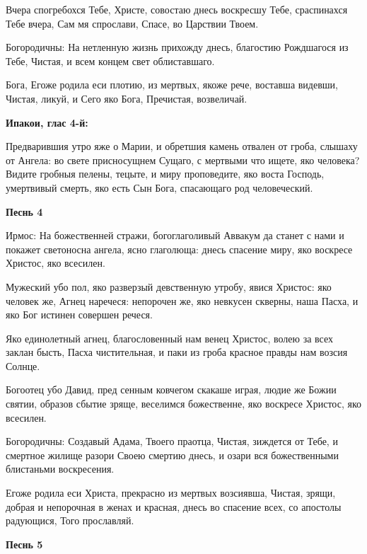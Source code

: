 Вчера спогребохся Тебе, Христе, совостаю днесь воскресшу Тебе, сраспинахся Тебе вчера, Сам мя спрослави, Спасе, во Царствии Твоем. \itshape 

Богородичны\normalfont{}: На нетленную жизнь прихожду днесь, благостию Рождшагося из Тебе, Чистая, и всем концем свет облиставшаго. 



Бога, Егоже родила еси плотию, из мертвых, якоже рече, воставша видевши, Чистая, ликуй, и Сего яко Бога, Пречистая, возвеличай. 


\medskip
\bfseries Ипакои, глас 4-й:

\normalfont{}Предварившия утро яже о Марии, и обретшия камень отвален от гроба, слышаху от Ангела: во свете присносущнем Сущаго, с мертвыми что ищете, яко человека? Видите гробныя пелены, тецыте, и миру проповедите, яко воста Господь, умертвивый смерть, яко есть Сын Бога, спасающаго род человеческий.


\medskip
\bfseries Песнь 4 \normalfont{}\itshape 

Ирмос\normalfont{}: На божественней стражи, богоглаголивый Аввакум да станет с нами и покажет светоносна ангела, ясно глаголюща: днесь спасение миру, яко воскресе Христос, яко всесилен. 



Мужеский убо пол, яко разверзый девственную утробу, явися Христос: яко человек же, Агнец наречеся: непорочен же, яко невкусен скверны, наша Пасха, и яко Бог истинен совершен речеся. 



Яко единолетный агнец, благословенный нам венец Христос, волею за всех заклан бысть, Пасха чистительная, и паки из гроба красное правды нам возсия Солнце. 



Богоотец убо Давид, пред сенным ковчегом скакаше играя, людие же Божии святии, образов сбытие зряще, веселимся божественне, яко воскресе Христос, яко всесилен. \itshape 

Богородичны\normalfont{}: Создавый Адама, Твоего праотца, Чистая, зиждется от Тебе, и смертное жилище разори Своею смертию днесь, и озари вся божественными блистаньми воскресения. 



Егоже родила еси Христа, прекрасно из мертвых возсиявша, Чистая, зрящи, добрая и непорочная в женах и красная, днесь во спасение всех, со апостолы радующися, Того прославляй.


\medskip
\bfseries Песнь 5 

